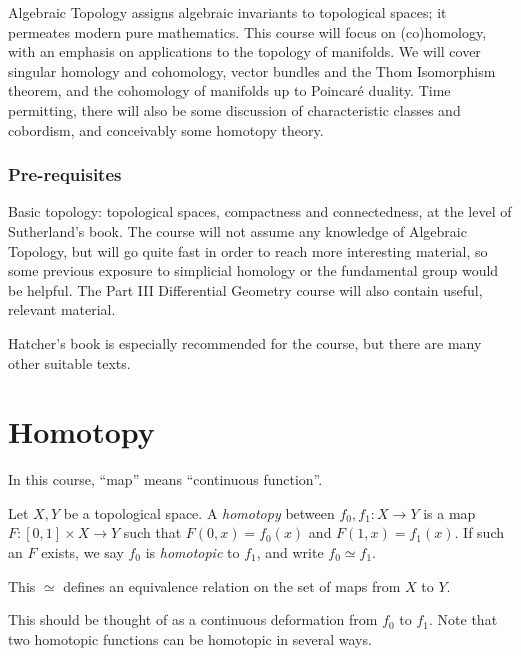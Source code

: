 \documentclass[a4paper]{article}
\begin{document}
\maketitle
{\small
\setlength{\parindent}{0em}
\setlength{\parskip}{1em}

Algebraic Topology assigns algebraic invariants to topological spaces; it permeates modern pure mathematics. This course will focus on (co)homology, with an emphasis on applications to the topology of manifolds. We will cover singular homology and cohomology, vector bundles and the Thom Isomorphism theorem, and the cohomology of manifolds up to Poincar\'e duality. Time permitting, there will also be some discussion of characteristic classes and cobordism, and conceivably some homotopy theory.

\subsubsection*{Pre-requisites}

Basic topology: topological spaces, compactness and connectedness, at the level of Sutherland's book. The course will not assume any knowledge of Algebraic Topology, but will go quite fast in order to reach more interesting material, so some previous exposure to simplicial homology or the fundamental group would be helpful. The Part III Differential Geometry course will also contain useful, relevant material.

Hatcher's book is especially recommended for the course, but there are many other suitable texts.
}
\tableofcontents

\section{Homotopy}
In this course, ``map'' means ``continuous function''.

\begin{defi}[Homotopy]
  Let $X, Y$ be a topological space. A \emph{homotopy} between $f_0, f_1: X \to Y$ is a map $F: [0, 1] \times X \to Y$ such that $F(0, x) = f_0(x)$ and $F(1, x) = f_1(x)$. If such an $F$ exists, we say $f_0$ is \emph{homotopic} to $f_1$, and write $f_0 \simeq f_1$.

  This $\simeq$ defines an equivalence relation on the set of maps from $X$ to $Y$.
\end{defi}
This should be thought of as a continuous deformation from $f_0$ to $f_1$. Note that two homotopic functions can be homotopic in several ways.
\end{document}

